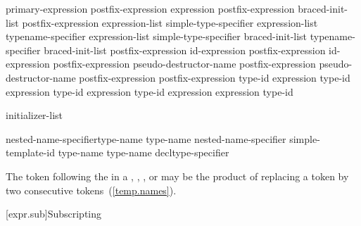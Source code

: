 \begin{bnf}
\br
    primary-expression\br
    postfix-expression \terminal{[} expression \terminal{]}\br
    postfix-expression \terminal{[} braced-init-list \terminal{]}\br
    postfix-expression \terminal{(} expression-list\opt \terminal{)}\br
    simple-type-specifier \terminal{(} expression-list\opt \terminal{)}\br
    typename-specifier \terminal{(} expression-list\opt \terminal{)}\br
    simple-type-specifier braced-init-list\br
    typename-specifier braced-init-list\br
    postfix-expression \opt id-expression\br
    postfix-expression \opt id-expression\br
    postfix-expression  pseudo-destructor-name\br
    postfix-expression \terminal{->} pseudo-destructor-name\br
    postfix-expression \terminal{++}\br
    postfix-expression \terminal{-{-}}\br
     type-id \terminal{> (} expression \terminal{)}\br
     type-id \terminal{> (} expression \terminal{)}\br
     type-id \terminal{> (} expression \terminal{)}\br
     type-id \terminal{> (} expression \terminal{)}\br
     expression \terminal{)}\br
     type-id \terminal{)}
\end{bnf}


\begin{bnf}
\br
    initializer-list
\end{bnf}


\begin{bnf}
\br
    nested-name-specifier\opt type-name \terminal{::\,\tilde} type-name\br
    nested-name-specifier  simple-template-id \terminal{::\,\tilde} type-name\br
    \terminal{\tilde} type-name\br
    \terminal{\tilde} decltype-specifier
\end{bnf}

\pnum
\enternote The \tcode{>} token following the
 in a ,
, , or
 may be the product of replacing a
\tcode{>{>}} token by two consecutive \tcode{>}
tokens~(\ref{temp.names}).\exitnote

[expr.sub]{Subscripting}

